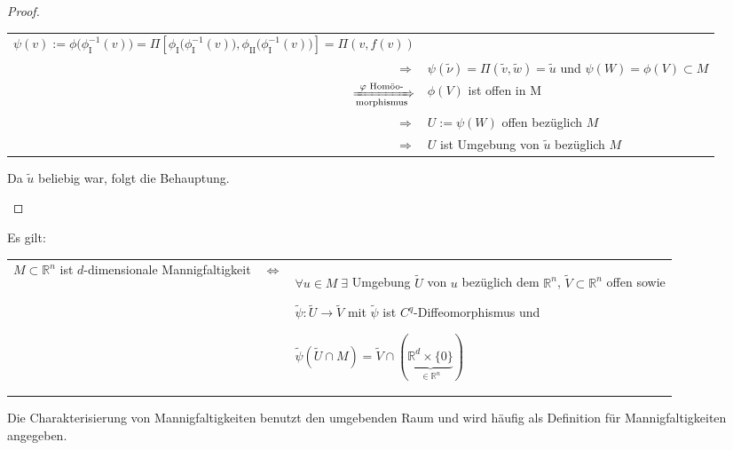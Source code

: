 \begin{proof}
\begin{itemize}
\begin{tabularx}{\linewidth}{r@{\ }X}
			\vspace*{1mm}
			\hspace*{1em} $\psi(v) := \phi\big(\phi_{\text{I}}^{-1}(v)\big) = \Pi\left[\phi_{\text{I}}\big(\phi_{\text{I}}^{-1}(v)\big),\phi_{\text{II}}\big(\phi_{\text{I}}^{-1}(v)\big)\right] = \Pi(v, f(v))$
			 \\
			$\Rightarrow$ & $\psi(\tilde{\nu}) = \Pi(\tilde{v}, \tilde{w}) = \tilde{u}$ und $\psi(W) = \phi(V)\subset M$ \\
			$\xRightarrow[\text{morphismus}]{\phi \text{ Homöo-}}$ & $\phi(V)$ ist offen in M \\
			$\Rightarrow$ & $U := \psi(W)$ offen bezüglich $M$ \\
			$\Rightarrow$ &$U$ ist Umgebung von $\tilde{u}$ bezüglich $M$
		\end{tabularx}
		Da $\tilde{u}$ beliebig war, folgt die Behauptung.
	\end{itemize}
\end{proof}

\begin{proposition}
	Es gilt:
	
	\begin{tabularx}{\linewidth}{p{5cm}@{\ }c@{\ }X}
	$M\subset \mathbb{R}^n$ ist $d$-dimensionale Mannigfaltigkeit & $\Leftrightarrow$ & $\forall u\in M\;\exists$ Umgebung $\tilde{U}$ von $u$ bezüglich dem $\mathbb{R}^n$, $\tilde{V}\subset\mathbb{R}^n$ offen sowie
	
	$\tilde{\psi}\!: \tilde{U}\to \tilde{V}$ mit $\tilde{\psi}$ ist $C^q$-Diffeomorphismus und
	
	\vspace*{1mm}
	\hspace*{1em}$\tilde{\psi}(\tilde{U}\cap M) = \tilde{V} \cap (\underbrace{\mathbb{R}^d \times \{ 0 \}}_{\in \mathbb{R}^n})$
	\end{tabularx}
\end{proposition}

\begin{underlinedenvironment}[Bemerkung]
	Die Charakterisierung von Mannigfaltigkeiten benutzt den umgebenden Raum und wird häufig als Definition für Mannigfaltigkeiten angegeben.
\end{underlinedenvironment}

